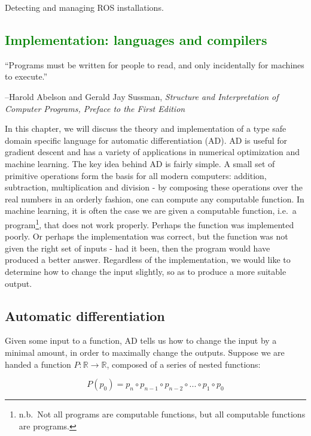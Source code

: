 \documentclass[12pt,initial,twoside,maitrise]{dms}
\newcommand{\mediumwell}[1]{\textcolor{green}{#1}}
\numberwithin{equation}{section}
\numberwithin{table}{chapter}
\numberwithin{figure}{chapter}
\begin{document}
Detecting and managing ROS installations.

\mediumwell{\chapter{Implementation: languages and compilers}\label{ch:kotlingrad}}

\setlength{\epigraphwidth}{0.5\textwidth}
\epigraph{``Programs must be written for people to read, and only incidentally for machines to execute.''}{\begin{flushright}--Harold Abelson and Gerald Jay Sussman, \textit{Structure and Interpretation of Computer Programs, Preface to the First Edition~\cite{abelson1996structure}}\end{flushright}}

In this chapter, we will discuss the theory and implementation of a type safe domain specific language for automatic differentiation (AD). AD is useful for gradient descent and has a variety of applications in numerical optimization and machine learning. The key idea behind AD is fairly simple. A small set of primitive operations form the basis for all modern computers: addition, subtraction, multiplication and division - by composing these operations over the real numbers in an orderly fashion, one can compute any computable function. In machine learning, it is often the case we are given a computable function, i.e.\ a program\footnote{n.b.\ Not all programs are computable functions, but all computable functions are programs.}, that does not work properly. Perhaps the function was implemented poorly. Or perhaps the implementation was correct, but the function was not given the right set of inputs - had it been, then the program would have produced a better answer. Regardless of the implementation, we would like to determine how to change the input slightly, so as to produce a more suitable output.

\section{Automatic differentiation}

Given some input to a function, AD tells us how to change the input by a minimal amount, in order to maximally change the outputs. Suppose we are handed a function $P: \mathbb{R}\rightarrow\mathbb{R}$, composed of a series of nested functions:

%
\begin{equation}
    P(p_0)=p_n \circ p_{n-1} \circ p_{n-2} \circ ... \circ p_1 \circ p_0
\end{equation}
%
\end{document}
